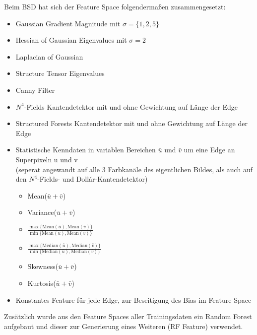 
Beim BSD hat sich der Feature Space folgendermaßen zusammengesetzt:

\begin{itemize}
	\item Gaussian Gradient Magnitude mit $\sigma=\{1, 2, 5\}$
	\item Hessian of Gaussian Eigenvalues mit $\sigma=2$
	\item Laplacian of Gaussian
	\item Structure Tensor Eigenvalues
	\item Canny Filter
	\item $N^4$-Fields Kantendetektor \cite{n4} mit und ohne Gewichtung auf Länge der Edge
	\item Structured Forests Kantendetektor \cite[Dollár et al.]{dollar} mit und ohne Gewichtung auf Länge der Edge
	\item Statistische Kenndaten in variablen Bereichen $\bar{u}$ und $\bar{v}$ um eine Edge an Superpixeln u und v \\
	(seperat angewandt auf alle 3 Farbkanäle des eigentlichen Bildes, als auch auf den $N^4$-Fields- und Dollár-Kantendetektor)
	\begin{itemize}
		\item Mean($\bar{u} + \bar{v}$)
		\item Variance($\bar{u} + \bar{v}$)
		\item $\frac{\max{\{\text{Mean}(\bar{u}), \text{Mean}(\bar{v}) \}}}{\min{\{\text{Mean}(\bar{u}), \text{Mean}(\bar{v})}\}}$
		\item $\frac{\max{\{\text{Median}(\bar{u}), \text{Median}(\bar{v}) \}}}{\min{\{\text{Median}(\bar{u}), \text{Median}(\bar{v})}\}}$
		\item Skewness($\bar{u} + \bar{v}$)
		\item Kurtosis($\bar{u} + \bar{v}$)
	\end{itemize}
	\item Konstantes Feature für jede Edge, zur Beseitigung des Bias im Feature Space
\end{itemize}

Zusätzlich wurde aus den Feature Spaces aller Trainingsdaten ein Random Forest aufgebaut und dieser zur Generierung eines Weiteren (RF Feature) verwendet.







